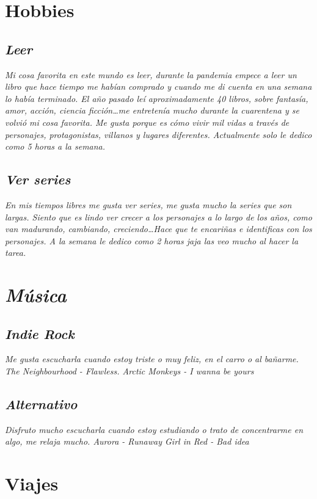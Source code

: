 \documentclass[12pt, letterpaper]{article}
\begin{document}
\section{\textit\huge{Hobbies}}
\subsection{\textit{Leer}}

\textit{Mi cosa favorita en este mundo es leer, durante la pandemia empece a leer un libro que hace tiempo me habían comprado y cuando me di cuenta en una semana lo había terminado. El año pasado leí aproximadamente 40 libros, sobre fantasía, amor, acción, ciencia ficción…me entretenía mucho durante la cuarentena y se volvió mi cosa favorita. Me gusta porque es cómo vivir mil vidas a través de personajes, protagonistas, villanos y lugares diferentes. Actualmente solo le dedico como 5 horas a la semana.}

\subsection{\textit{Ver series}}

\textit{En mis tiempos libres me gusta ver series, me gusta mucho la series que son largas. Siento que es lindo ver crecer a los personajes a lo largo de los años, como van madurando, cambiando, creciendo…Hace que te encariñas e identificas con los personajes. A la semana le dedico como 2 horas jaja las veo mucho al hacer la tarea.}

\section{\textsl{Música}}

\subsection{\textsl{Indie Rock}}
\textsl{\tiny{Me gusta escucharla cuando estoy triste o muy feliz, en el carro o al bañarme. 
The Neighbourhood - Flawless.     Arctic Monkeys - I wanna be yours}}

\subsection{\textsl{Alternativo}}
\textsl{\tiny{Disfruto mucho escucharla cuando estoy estudiando o trato de concentrarme en algo, me relaja mucho. 
Aurora - Runaway   Girl in Red - Bad idea}}

\section{Viajes}
\end{document}
